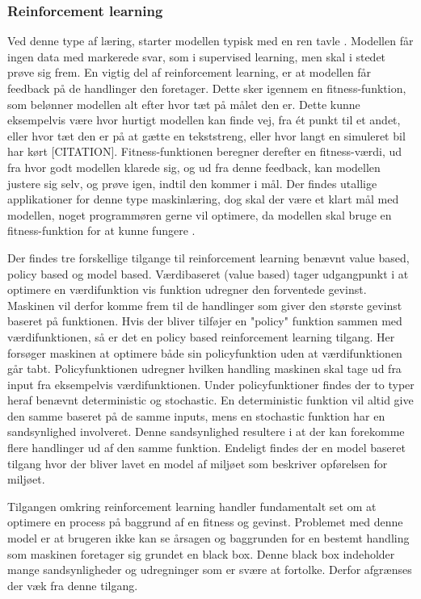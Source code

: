 \subsubsection{Reinforcement learning}
Ved denne type af læring, starter modellen typisk med en ren tavle \cite{deep-reinforcement-learning}. Modellen får ingen data med markerede svar, som i supervised learning, men skal i stedet prøve sig frem. En vigtig del af reinforcement learning, er at modellen får feedback på de handlinger den foretager. Dette sker igennem en fitness-funktion, som belønner modellen alt efter hvor tæt på målet den er. Dette kunne eksempelvis være hvor hurtigt modellen kan finde vej, fra ét punkt til et andet, eller hvor tæt den er på at gætte en tekststreng, eller hvor langt en simuleret bil har kørt [CITATION]. Fitness-funktionen beregner derefter en fitness-værdi, ud fra hvor godt modellen klarede sig, og ud fra denne feedback, kan modellen justere sig selv, og prøve igen, indtil den kommer i mål. Der findes utallige applikationer for denne type maskinlæring, dog skal der være et klart mål med modellen, noget programmøren gerne vil optimere, da modellen skal bruge en fitness-funktion for at kunne fungere \cite{deep-reinforcement-learning}. 

Der findes tre forskellige tilgange til reinforcement learning benævnt value based, policy based og model based. Værdibaseret (value based) tager udgangpunkt i at optimere en værdifunktion vis funktion udregner den forventede gevinst. Maskinen vil derfor komme frem til de handlinger som giver den største gevinst baseret på funktionen. Hvis der bliver tilføjer en "policy" funktion sammen med værdifunktionen, så er det en policy based reinforcement learning tilgang. Her forsøger maskinen at optimere både sin policyfunktion uden at værdifunktionen går tabt. Policyfunktionen udregner hvilken handling maskinen skal tage ud fra input fra eksempelvis værdifunktionen. Under policyfunktioner findes der to typer heraf benævnt deterministic og stochastic. En deterministic funktion vil altid give den samme baseret på de samme inputs, mens en stochastic funktion har en sandsynlighed involveret. Denne sandsynlighed resultere i at der kan forekomme flere handlinger ud af den samme funktion. Endeligt findes der en model baseret tilgang hvor der bliver lavet en model af miljøet som beskriver opførelsen for miljøet. \cite{RLapproaches}

Tilgangen omkring reinforcement learning handler fundamentalt set om at optimere en process på baggrund af en fitness og gevinst. Problemet med denne model er at brugeren ikke kan se årsagen og baggrunden for en bestemt handling som maskinen foretager sig grundet en black box. Denne black box indeholder mange sandsynligheder og udregninger som er svære at fortolke. Derfor afgrænses der væk fra denne tilgang.


